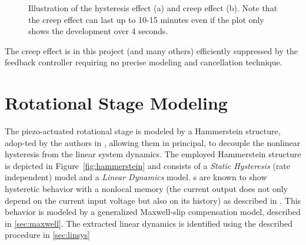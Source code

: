 \begin{figure}[h!]
  \centering %
  \qquad
  \caption{\label{fig:effects} Illustration of the hysteresis effect (a) and creep effect (b). Note that the creep effect can last up to 10-15 minutes even if the plot only shows the development over 4 seconds.}
\end{figure}

The creep effect is in this project (and many others) efficiently suppressed by the feedback controller requiring no precise modeling and cancellation technique.

\section{Rotational Stage Modeling}
The piezo-actuated rotational stage is modeled by a Hammerstein structure, adop-ted by the authors in \citep{ButcherController:2015}, allowing them in principal, to decouple the nonlinear hysteresis from the linear system dynamics. The employed Hammerstein structure is depicted in Figure~\ref{fig:hammerstein} and consists of a \emph{Static Hysteresis} (rate independent) model and a \emph{Linear Dynamics} model. {\abbrPEA}s are known to show hysteretic behavior with a nonlocal memory (the current output does not only depend on the current input voltage but also on its history) as described in \citep{ButcherIdentification:2015}. This behavior is modeled by a generalized Maxwell-slip compensation model, described in \ref{sec:maxwell}. The extracted linear dynamics is identified using the described procedure in \ref{sec:linsys}

